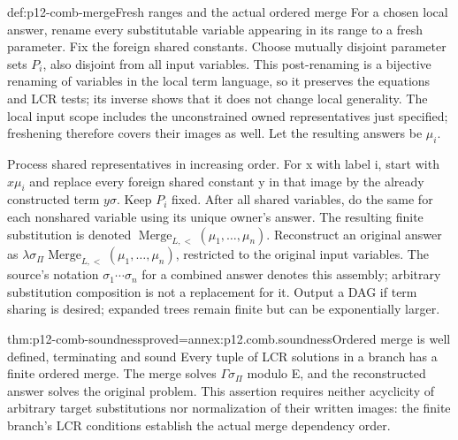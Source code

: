 \begin{hbmethod}{def:p12-comb-merge}{Fresh ranges and the actual ordered merge}
For a chosen local answer, rename every substitutable variable appearing
in its range to a fresh parameter. Fix the foreign shared constants.
Choose mutually disjoint parameter sets \(P_i\), also disjoint from all
input variables. This post-renaming is a bijective renaming of variables
in the local term language, so it preserves the equations and LCR tests;
its inverse shows that it does not change local generality. The local
input scope includes the unconstrained owned representatives just
specified; freshening therefore covers their images as well.
Let the resulting answers be \(\mu_i\).

Process shared representatives in increasing order. For x with label i,
start with \(x\mu_i\) and replace every foreign shared constant y in
that image by the already constructed term \(y\sigma\). Keep \(P_i\)
fixed. After all shared variables, do the same for each nonshared
variable using its unique owner's answer. The resulting finite
substitution is denoted
\(\operatorname{Merge}_{L,<}(\mu_1,\ldots,\mu_n)\).
Reconstruct an original answer as
\(\lambda\sigma_\Pi\operatorname{Merge}_{L,<}(\mu_1,\ldots,\mu_n)\),
restricted to the original input variables. The source's notation
\(\sigma_1\cdots\sigma_n\) for a combined answer denotes this
assembly; arbitrary substitution composition is not a replacement
for it. Output a DAG if term sharing is desired; expanded trees remain
finite but can be exponentially larger.
\cite[pp.~517--518]{BaaderSnyder2001}
\end{hbmethod}

\begin{hbtheorem}{thm:p12-comb-soundness}{proved=annex:p12.comb.soundness}{Ordered merge is well defined, terminating and sound}
Every tuple of LCR solutions in a branch has a finite ordered merge.
The merge solves \(\Gamma\sigma_\Pi\) modulo E, and the reconstructed
answer solves the original problem. This assertion requires neither
acyclicity of arbitrary target substitutions nor normalization of their
written images: the finite branch's LCR conditions establish the actual
merge dependency order.
\end{hbtheorem}

